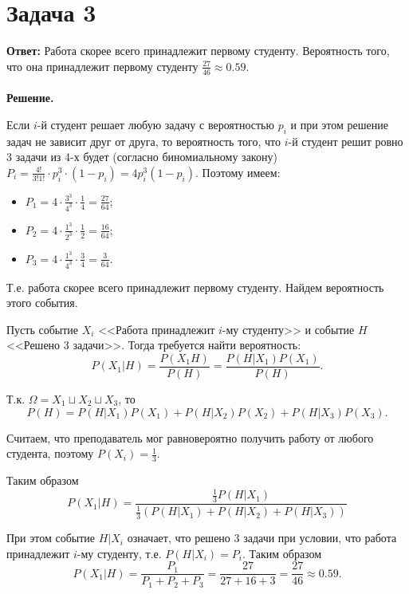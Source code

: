 \documentclass{article}
\begin{document}
\section*{Задача 3}
{\bf Ответ: } Работа скорее всего принадлежит первому студенту. Вероятность того, что она принадлежит первому студенту $\frac{27}{46}\approx 0.59$.
\\
\\
{\bf Решение.}
\par
Если $i$-й студент решает любую задачу с вероятностью $p_i$ и при этом решение задач не зависит друг от друга, то вероятность того, что $i$-й студент решит ровно 3 задачи из 4-х будет (согласно биномиальному закону) $P_i=\frac{4!}{3!1!}\cdot p_i^3\cdot(1-p_i)=4p_i^3(1-p_i)$. Поэтому имеем:
\begin{itemize}
    \item $P_1 = 4\cdot\frac{3^3}{4^3}\cdot\frac{1}{4}=\frac{27}{64}$;
    \item $P_2 = 4\cdot\frac{1^3}{2^3}\cdot\frac{1}{2}=\frac{16}{64}$;
    \item $P_3 = 4\cdot\frac{1^3}{4^3}\cdot\frac{3}{4}=\frac{3}{64}$.
\end{itemize}
\par
Т.е. работа скорее всего принадлежит первому студенту. Найдем вероятность этого события.
\par
Пусть событие $X_i$ <<Работа принадлежит $i$-му студенту>> и событие $H$ <<Решено 3 задачи>>. Тогда требуется найти вероятность:
$$P(X_1|H)=\frac{P(X_1 H)}{P(H)}=\frac{P(H|X_1)P(X_1)}{P(H)}.$$
\par
Т.к. $\Omega=X_1\sqcup X_2\sqcup X_3$, то 
$$P(H)=P(H|X_1)P(X_1)+P(H|X_2)P(X_2)+P(H|X_3)P(X_3).$$
\par
Считаем, что преподаватель мог равновероятно получить работу от любого студента, поэтому $P(X_i)=\frac{1}{3}$.
\par
Таким образом
$$P(X_1|H)=\frac{\frac{1}{3}P(H|X_1)}{\frac{1}{3}(P(H|X_1)+P(H|X_2)+P(H|X_3))}$$
\par
При этом событие $H|X_i$ означает, что решено 3 задачи при условии, что работа принадлежит $i$-му студенту, т.е. $P(H|X_i)=P_i$. Таким образом
$$P(X_1|H)=\frac{P_1}{P_1+P_2+P_3}=\frac{27}{27+16+3}=\frac{27}{46}\approx 0.59.$$
\end{document}
